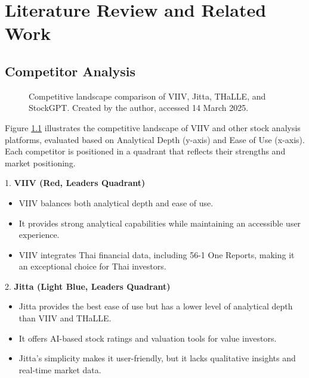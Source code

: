 \chapter{Literature Review and Related Work}
\label{chap:relatedworks}

\section{Competitor Analysis}
\label{section:competitor-analysis}

\begin{figure}[h]
    \centering
    \caption{Competitive landscape comparison of VIIV, Jitta, THaLLE, and StockGPT. Created by the author, accessed 14 March 2025.}
    \label{fig:competitive-landscape}
\end{figure}

Figure \ref{fig:competitive-landscape} illustrates the competitive landscape of VIIV and other stock analysis platforms, evaluated based on Analytical Depth (y-axis) and Ease of Use (x-axis). 
Each competitor is positioned in a quadrant that reflects their strengths and market positioning.

1. \textbf{VIIV (Red, Leaders Quadrant)}

\begin{itemize}[leftmargin=80pt]
    \item VIIV balances both analytical depth and ease of use.
    \item It provides strong analytical capabilities while maintaining an accessible user experience.
    \item VIIV integrates Thai financial data, including 56-1 One Reports, making it an exceptional choice for Thai investors.
\end{itemize}

2. \textbf{Jitta (Light Blue, Leaders Quadrant)}

\begin{itemize}[leftmargin=80pt]
    \item Jitta provides the best ease of use but has a lower level of analytical depth than VIIV and THaLLE.
    \item It offers AI-based stock ratings and valuation tools for value investors.
    \item Jitta’s simplicity makes it user-friendly, but it lacks qualitative insights and real-time market data.
\end{itemize}

